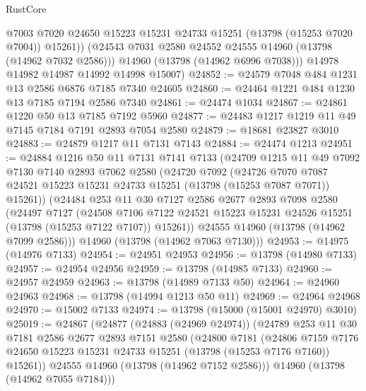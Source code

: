 \begin{lexlean}{RustCore}
\begin{coremodule}
            @7003
            @7020
            @24650
            @15223
            @15231
            @24733
            @15251
            (@13798 (@15253 @7020 @7004))
            @15261))
        (@24543 @7031 @2580 @24552 @24555 @14960 (@13798 (@14962 @7032 @2586)))
        @14960
        (@13798 (@14962 @6996 @7038)))
      @14978
      @14982
      @14987
      @14992
      @14998
      @15007)
@24852 := @24579 @7048 @484 @1231 @13 @2586 @6876 @7185 @7340 @24605
@24860 := @24464 @1221 @484 @1230 @13 @7185 @7194 @2586 @7340
@24861 := @24474 @1034
@24867 := @24861 @1220 @50 @13 @7185 @7192 @5960
@24877 := @24483 @1217 @1219 @11 @49 @7145 @7184 @7191 @2893 @7054 @2580
@24879 := @18681 @23827 @3010
@24883 := @24879 @1217 @11 @7131 @7143
@24884 := @24474 @1213
@24951 := @24884
    @1216
    @50
    @11
    @7131
    @7141
    @7133
    (@24709
      @1215
      @11
      @49
      @7092
      @7130
      @7140
      @2893
      @7062
      @2580
      (@24720
        @7092
        (@24726
          @7070
          @7087
          @24521
          @15223
          @15231
          @24733
          @15251
          (@13798 (@15253 @7087 @7071))
          @15261))
      (@24484
        @253
        @11
        @30
        @7127
        @2586
        @2677
        @2893
        @7098
        @2580
        (@24497
          @7127
          (@24508
            @7106
            @7122
            @24521
            @15223
            @15231
            @24526
            @15251
            (@13798 (@15253 @7122 @7107))
            @15261))
        @24555
        @14960
        (@13798 (@14962 @7099 @2586)))
      @14960
      (@13798 (@14962 @7063 @7130)))
@24953 := @14975 (@14976 @7133)
@24954 := @24951 @24953
@24956 := @13798 (@14980 @7133)
@24957 := @24954 @24956
@24959 := @13798 (@14985 @7133)
@24960 := @24957 @24959
@24963 := @13798 (@14989 @7133 @50)
@24964 := @24960 @24963
@24968 := @13798 (@14994 @1213 @50 @11)
@24969 := @24964 @24968
@24970 := @15002 @7133
@24974 := @13798 (@15000 (@15001 @24970) @3010)
@25019 := @24867
    (@24877
      (@24883 (@24969 @24974))
      (@24789
        @253
        @11
        @30
        @7181
        @2586
        @2677
        @2893
        @7151
        @2580
        (@24800
          @7181
          (@24806
            @7159
            @7176
            @24650
            @15223
            @15231
            @24733
            @15251
            (@13798 (@15253 @7176 @7160))
            @15261))
        @24555
        @14960
        (@13798 (@14962 @7152 @2586)))
      @14960
      (@13798 (@14962 @7055 @7184)))

\end{coremodule}
\end{lexlean}
